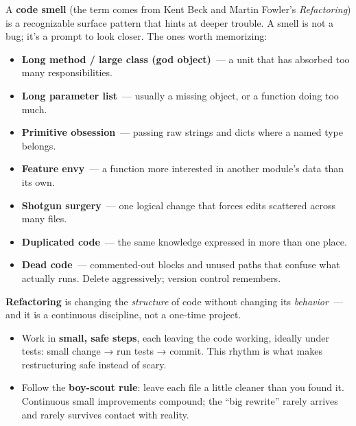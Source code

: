 \label{writing-good-code:code-smells}

A \textbf{code smell} (the term comes from Kent Beck and Martin Fowler's \emph{Refactoring}) is a
recognizable surface pattern that hints at deeper trouble. A smell is not a
bug; it's a prompt to look closer. The ones worth memorizing:

\begin{itemize}
\tightlist
\item
  \textbf{Long method / large class (god object)}~--- a unit that has absorbed too many responsibilities.
\item
  \textbf{Long parameter list}~--- usually a missing object, or a function doing too much.
\item
  \textbf{Primitive obsession}~--- passing raw strings and dicts where a named type belongs.
\item
  \textbf{Feature envy}~--- a function more interested in another module's data than its own.
\item
  \textbf{Shotgun surgery}~--- one logical change that forces edits scattered across many files.
\item
  \textbf{Duplicated code}~--- the same knowledge expressed in more than one place.
\item
  \textbf{Dead code}~--- commented-out blocks and unused paths that confuse what actually runs. Delete
  aggressively; version control remembers.
\end{itemize}

\label{writing-good-code:refactoring}

\textbf{Refactoring} is changing the \emph{structure} of code without changing its \emph{behavior}~--- and it is a
continuous discipline, not a one-time project.

\begin{itemize}
\tightlist
\item
  Work in \textbf{small, safe steps}, each leaving the code working, ideally under tests: small change →
  run tests → commit. This rhythm is what makes restructuring safe instead of scary.
\item
  Follow the \textbf{boy-scout rule}: leave each file a little cleaner than you found it. Continuous small
  improvements compound; the ``big rewrite'' rarely arrives and rarely survives contact with reality.
\end{itemize}

\label{writing-good-code:strategic-vs-tactical-programming}

